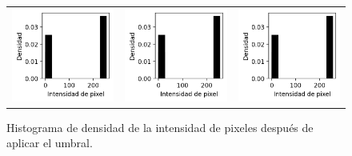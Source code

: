 \begin{figure}[!h]
\begin{tabular}{ccc}
        \includegraphics[width=4cm]{../Plots/THR/threshold_output_6.png} &
        \includegraphics[width=4cm]{../Plots/THR/threshold_output_7.png} &
        \includegraphics[width=4cm]{../Plots/THR/threshold_output_8.png} \\

    \end{tabular}        
    \caption{Histograma de densidad de la intensidad de pixeles después de aplicar el umbral.}
    \label{fig:thresh_out_1}
\end{figure}

